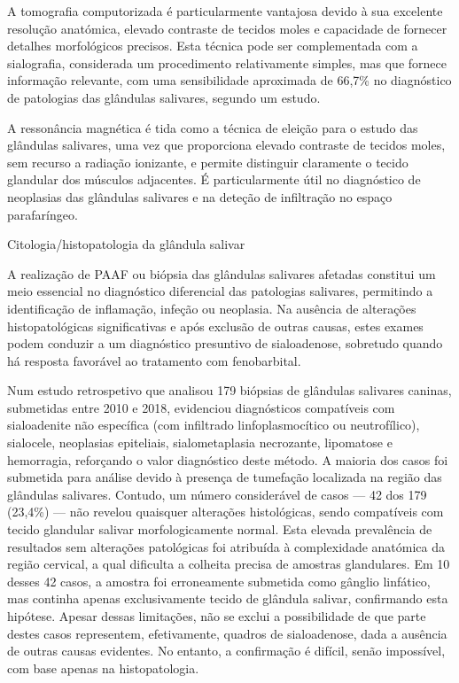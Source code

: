 A tomografia computorizada é particularmente vantajosa devido à sua excelente resolução anatómica, elevado contraste de tecidos moles e capacidade de fornecer detalhes morfológicos precisos. \cite{gil_anatomic_2018} Esta técnica pode ser complementada com a sialografia, considerada um procedimento relativamente simples, mas que fornece informação relevante, com uma sensibilidade aproximada de 66,7\% no diagnóstico de patologias das glândulas salivares, segundo um estudo. \cite{seiler_acvr_2022,kneissl_ct_2011}


A ressonância magnética é tida como a técnica de eleição para o estudo das glândulas salivares, uma vez que proporciona elevado contraste de tecidos moles, sem recurso a radiação ionizante, e permite distinguir claramente o tecido glandular dos músculos adjacentes. \cite{gil_anatomic_2018} É particularmente útil no diagnóstico de neoplasias das glândulas salivares e na deteção de infiltração no espaço parafaríngeo. \cite{gil_anatomic_2018}


Citologia/histopatologia da glândula salivar


A realização de PAAF ou biópsia das glândulas salivares afetadas constitui um meio essencial no diagnóstico diferencial das patologias salivares, permitindo a identificação de inflamação, infeção ou neoplasia. Na ausência de alterações histopatológicas significativas e após exclusão de outras causas, estes exames podem conduzir a um diagnóstico presuntivo de sialoadenose, sobretudo quando há resposta favorável ao tratamento com fenobarbital.


Num estudo retrospetivo que analisou 179 biópsias de glândulas salivares caninas, submetidas entre 2010 e 2018, evidenciou diagnósticos compatíveis com sialoadenite não específica (com infiltrado linfoplasmocítico ou neutrofílico), sialocele, neoplasias epiteliais, sialometaplasia necrozante, lipomatose e hemorragia, reforçando o valor diagnóstico deste método. A maioria dos casos foi submetida para análise devido à presença de tumefação localizada na região das glândulas salivares. Contudo, um número considerável de casos — 42 dos 179 (23,4\%) — não revelou quaisquer alterações histológicas, sendo compatíveis com tecido glandular salivar morfologicamente normal. Esta elevada prevalência de resultados sem alterações patológicas foi atribuída à complexidade anatómica da região cervical, a qual dificulta a colheita precisa de amostras glandulares. Em 10 desses 42 casos, a amostra foi erroneamente submetida como gânglio linfático, mas continha apenas exclusivamente tecido de glândula salivar, confirmando esta hipótese.
Apesar dessas limitações, não se exclui a possibilidade de que parte destes casos representem, efetivamente, quadros de sialoadenose, dada a ausência de outras causas evidentes. No entanto, a confirmação é difícil, senão impossível, com base apenas na histopatologia.


